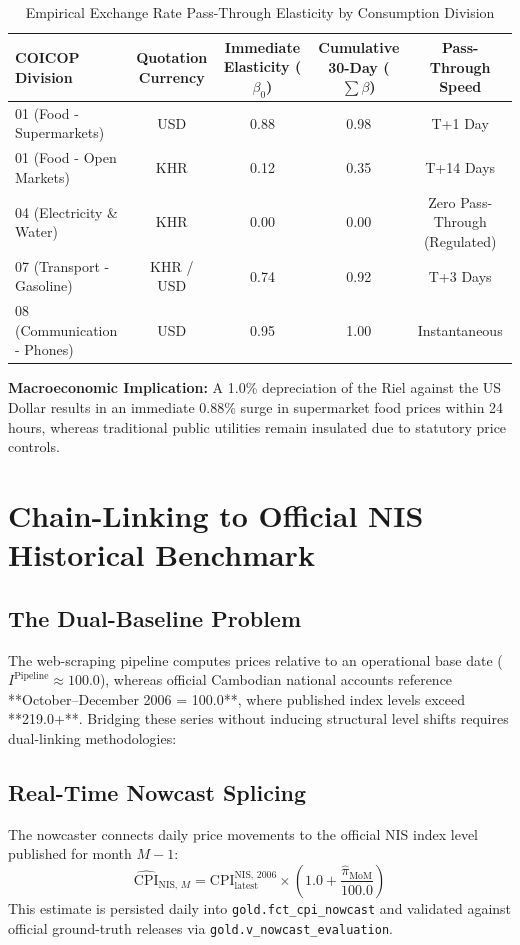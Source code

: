 \documentclass[11pt,a4paper,oneside]{article}
\begin{document}
\begin{table}[h]
\centering
\small
\caption{Empirical Exchange Rate Pass-Through Elasticity by Consumption Division}
\begin{tabular}{lcccc}
\toprule
\textbf{COICOP Division} & \textbf{Quotation Currency} & \textbf{Immediate Elasticity ($\beta_0$)} & \textbf{Cumulative 30-Day ($\sum \beta$)} & \textbf{Pass-Through Speed} \\
\midrule
01 (Food - Supermarkets) & USD & 0.88 & 0.98 & T+1 Day \\
01 (Food - Open Markets) & KHR & 0.12 & 0.35 & T+14 Days \\
04 (Electricity \& Water) & KHR & 0.00 & 0.00 & Zero Pass-Through (Regulated) \\
07 (Transport - Gasoline) & KHR / USD & 0.74 & 0.92 & T+3 Days \\
08 (Communication - Phones) & USD & 0.95 & 1.00 & Instantaneous \\
\bottomrule
\end{tabular}
\end{table}

\textbf{Macroeconomic Implication:} A 1.0\% depreciation of the Riel against the US Dollar results in an immediate 0.88\% surge in supermarket food prices within 24 hours, whereas traditional public utilities remain insulated due to statutory price controls.

\newpage

\section{Chain-Linking to Official NIS Historical Benchmark}

\subsection{The Dual-Baseline Problem}
The web-scraping pipeline computes prices relative to an operational base date ($I^{\text{Pipeline}} \approx 100.0$), whereas official Cambodian national accounts reference **October--December 2006 = 100.0**, where published index levels exceed **219.0+**. Bridging these series without inducing structural level shifts requires dual-linking methodologies:

\subsection{Real-Time Nowcast Splicing}
The nowcaster connects daily price movements to the official NIS index level published for month $M-1$:
\begin{equation}
\widehat{\text{CPI}}_{\text{NIS, } M} = \text{CPI}_{\text{latest}}^{\text{NIS, 2006}} \times \left( 1.0 + \frac{\hat{\pi}_{\text{MoM}}}{100.0} \right)
\end{equation}
This estimate is persisted daily into \texttt{gold.fct\_cpi\_nowcast} and validated against official ground-truth releases via \texttt{gold.v\_nowcast\_evaluation}.
\end{document}
